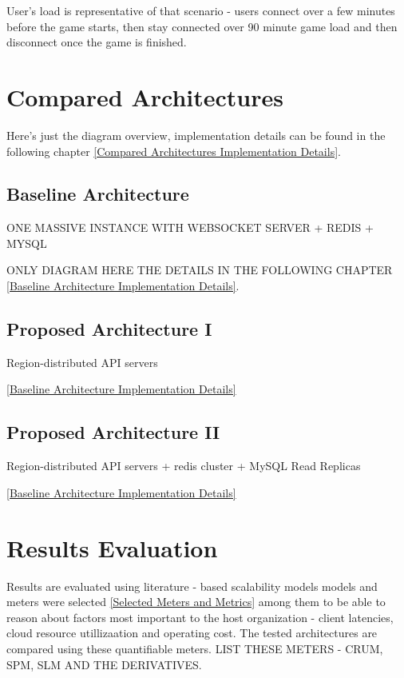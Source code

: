 \documentclass{uvamscse}
\begin{document}
User's load is representative of that scenario - users connect over a few minutes before the game starts, then stay connected over 90 minute game load and then disconnect once the game is finished.

\section{Compared Architectures}\label{Compared Architectures}

Here's just the diagram overview, implementation details can be found in the following chapter \ref{Compared Architectures Implementation Details}.

\subsection{Baseline Architecture}\label{Baseline Architecture}
ONE MASSIVE INSTANCE WITH WEBSOCKET SERVER + REDIS + MYSQL

ONLY DIAGRAM HERE THE DETAILS IN THE FOLLOWING CHAPTER \ref{Baseline Architecture Implementation Details}.

\subsection{Proposed Architecture I}\label{Proposed Architecture I}
Region-distributed API servers

\ref{Baseline Architecture Implementation Details}

\subsection{Proposed Architecture II}\label{Proposed Architecture II}
Region-distributed API servers + redis cluster + MySQL Read Replicas

\ref{Baseline Architecture Implementation Details}

\section{Results Evaluation}
Results are evaluated using literature - based scalability models \cite{Models}
models and meters were selected \ref{Selected Meters and Metrics} among them to be able to reason about factors most important to the host organization - client latencies, cloud resource utillizaation and operating cost. The tested architectures are compared using these quantifiable meters. LIST THESE METERS - CRUM, SPM, SLM AND THE DERIVATIVES.
\end{document}
